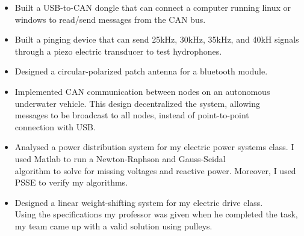 \documentclass[10pt,a4paper,ragged2e,withhyper]{altacv}
\begin{document}
\begin{paracol}{2}
\begin{itemize}
  \item Built a USB-to-CAN dongle that can connect a computer running linux or windows to read/send messages from the CAN bus.
  \item Built a pinging device that can send 25kHz, 30kHz, 35kHz, and 40kH signals through a piezo electric transducer to test hydrophones.
  \item Designed a circular-polarized patch antenna for a bluetooth module.
\end{itemize}

\begin{itemize}
	\item Implemented CAN communication between nodes on an autonomous underwater vehicle. This design decentralized the system, allowing \\messages to be broadcast to all nodes, instead of point-to-point \\connection with USB.
	\item Analysed a power distribution system for my electric power systems class. I used Matlab to run a Newton-Raphson and Gauss-Seidal \\algorithm to solve for missing voltages and reactive power. Moreover, I used PSSE to verify my algorithms. 
	\item Designed a linear weight-shifting system for my electric drive class. \\Using the specifications my professor was given when he completed the task, my team came up with a valid solution using pulleys.
\end{itemize}



\end{paracol}
\end{document}
